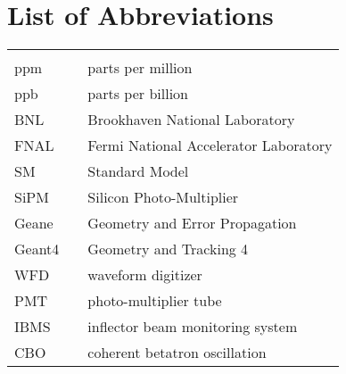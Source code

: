 \begin{abstractpage}

\end{abstractpage}
\cleardoublepage

{\hypersetup{linkcolor=black}

\tableofcontents
\cleardoublepage

\newpage
\listoftables
\cleardoublepage

\newpage
\listoffigures %
\cleardoublepage

\chapter*{List of Abbreviations}
\begin{center}
  \begin{tabular}{lll}
    \hspace*{2em} & \hspace*{1in} & \hspace*{4.5in} \\
    ppm  & \dotfill & parts per million \\
    ppb  & \dotfill & parts per billion \\
    BNL  & \dotfill & Brookhaven National Laboratory \\
    FNAL  & \dotfill & Fermi National Accelerator Laboratory \\
    SM  & \dotfill & Standard Model \\
    SiPM  & \dotfill & Silicon Photo-Multiplier \\
    Geane  & \dotfill & Geometry and Error Propagation \\
    Geant4  & \dotfill & Geometry and Tracking 4 \\
    WFD  & \dotfill & waveform digitizer \\
    PMT  & \dotfill & photo-multiplier tube \\
    IBMS & \dotfill & inflector beam monitoring system \\
    CBO & \dotfill & coherent betatron oscillation \\
  \end{tabular}
\end{center}
\cleardoublepage

} %


\newpage
\endofprelim
